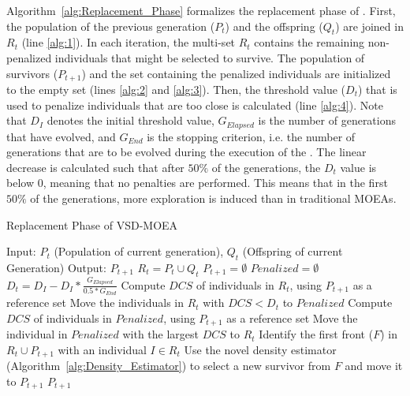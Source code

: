 Algorithm~\ref{alg:Replacement_Phase} formalizes the replacement phase of \VSDMOEA{}.
%
First, the population of the previous generation ($P_t$) and the offspring ($Q_t$) are joined
in $R_t$ (line \ref{alg:1}).
%
In each iteration, the multi-set $R_t$ contains the remaining non-penalized individuals that might be selected 
to survive.
%
The population of survivors ($P_{t+1}$) and the set containing the penalized individuals are initialized to
the empty set (lines \ref{alg:2} and \ref{alg:3}).
%
Then, the threshold value ($D_t$) that is used to penalize individuals that are too close is calculated (line \ref{alg:4}).
%
Note that $D_I$ denotes the initial threshold value, $G_{Elapsed}$ is the number of generations that have 
evolved, and $G_{End}$ is the stopping criterion, i.e. the number of generations that are to be evolved 
during the execution of the \VSDMOEA{}.
%
The linear decrease is calculated such that after $50\%$ of the generations, the $D_t$ value is below 0, 
meaning that no penalties are performed.
%
This means that in the first $50\%$ of the generations, more exploration is induced than in traditional MOEAs.
%

\begin{algorithm}[t]
	\caption{Replacement Phase of VSD-MOEA} 
\begin{small}
\begin{algorithmic}[1]
\STATE Input: $P_t$ (Population of current generation), $Q_t$ (Offspring of current Generation)
    	\STATE Output: $P_{t+1}$ 
        \STATE $R_t = P_t \cup Q_t$ \label{alg:1}
        \STATE $P_{t+1} = \emptyset$ \label{alg:2}
        \STATE $Penalized = \emptyset$ \label{alg:3}
				\STATE $D_t = D_I - D_I * \frac{G_{Elapsed}}{0.5*G_{End}}$ \label{alg:4}
         \label{alg:6}
					\STATE Compute $DCS$ of individuals in $R_t$, using $P_{t+1}$ as a reference set \label{alg:7}
					\STATE Move the individuals in $R_t$ with $DCS < D_t$ to $Penalized$ \label{alg:8}
        	 \label{alg:9}
						\STATE Compute $DCS$ of individuals in $Penalized$, using $P_{t+1}$ as a reference set \label{alg:10}
						\STATE Move the individual in $Penalized$ with the largest $DCS$ to $R_t$ \label{alg:11}
        	\ENDIF
					\STATE Identify the first front ($F$) in $R_t \cup P_{t+1}$ with an individual $I \in R_t$ \label{alg:12}
					\STATE Use the novel density estimator (Algorithm~\ref{alg:Density_Estimator}) to select a new survivor 
					from $F$ and move it to $P_{t+1}$\label{alg:13}
        \ENDWHILE
    	\RETURN $P_{t+1}$ \label{alg:14}
	\end{algorithmic}
\end{small}
\label{alg:Replacement_Phase}
\end{algorithm}

